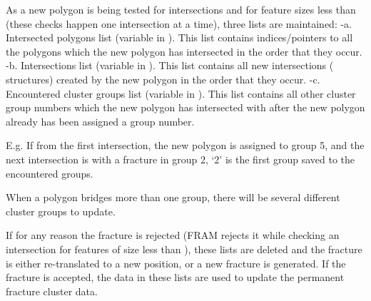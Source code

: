 \documentclass[letterpaper,10pt,english]{sphinxmanual}
\begin{document}
As a new polygon is being tested for intersections and for feature sizes less
than  (these checks happen one intersection at a time), three lists are
maintained:
-a.     Intersected polygons list (variable  in
).  This list contains indices/pointers to all the
polygons which the new polygon has intersected in the order that they occur.
-b. Intersections list (variable  in ). This
list contains all new intersections ( structures) created by the
new polygon in the order that they occur.
-c.     Encountered cluster groups list
(variable  in ). This list
contains all other cluster group numbers which the new polygon has intersected
with after the new polygon already has been assigned a group number.

E.g. If from the first intersection, the new polygon is assigned to group 5, and
the next intersection is with a fracture in group 2, ‘2’ is the first group
saved to the encountered groups.

When a polygon bridges more than one group, there will be several different
cluster groups to update.

If for any reason the fracture is rejected (FRAM rejects it while checking an
intersection for features of size less than ), these lists are deleted and
the fracture is either re-translated to a new position, or a new fracture is
generated. If the fracture is accepted, the data in these lists are used to
update the permanent fracture cluster data.
\end{document}
